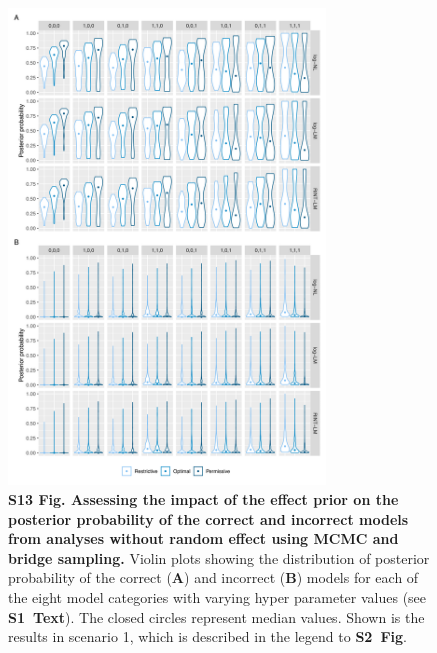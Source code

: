 \documentclass[11pt]{article}
\newcommand{\stext}{\textbf{S1~Text}\xspace}
\newcommand{\sfigroccmcmc}{\textbf{S2~Fig}\xspace}
\begin{document}
\begin{figure}[!ht]
\begin{center}
  \includegraphics[width=0.75\textwidth]{png/sim_vln_effect_mcmc_bs_noranef_noranef.png}
\end{center}  
\caption{
  {\bf
    S13 Fig.
    Assessing the impact of the effect prior on the posterior probability of the correct and incorrect models from analyses without random effect using MCMC and bridge sampling.}
Violin plots showing the distribution of posterior probability of the correct (\textbf{A}) and incorrect (\textbf{B}) models for each of the eight model categories with varying hyper parameter values (see \stext). The closed circles represent median values. Shown is the results in scenario 1, which is described in the legend to \sfigroccmcmc.
}
\label{s-fig:sim-effect-mcmc-noranef-noranef}
\end{figure}
\end{document}
